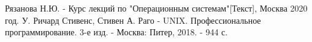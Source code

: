 \newpage
{}

\begin{thebibliography}{}
      Рязанова Н.Ю.  -  Курс лекций по "Операционным системам"[Текст], Москва 2020 год.
      У. Ричард Стивенс, Стивен А. Раго - UNIX. Профессиональное программирование. 3-е изд. - Москва: Питер, 2018. - 944 с.
\end{thebibliography}
